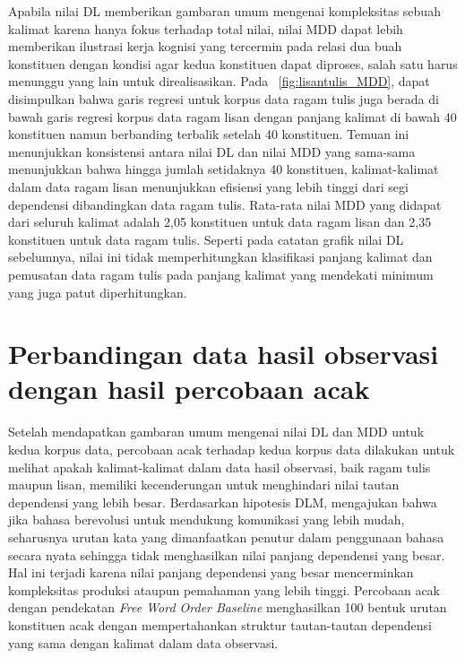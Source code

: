 Apabila nilai DL memberikan gambaran umum mengenai kompleksitas sebuah kalimat karena hanya fokus terhadap total nilai, nilai MDD dapat lebih memberikan ilustrasi kerja kognisi yang tercermin pada relasi dua buah konstituen dengan kondisi agar kedua konstituen dapat diproses, salah satu harus menunggu yang lain untuk direalisasikan. Pada \pic~\ref{fig:lisantulis_MDD}, dapat disimpulkan bahwa garis regresi untuk korpus data ragam tulis juga berada di bawah garis regresi korpus data ragam lisan dengan panjang kalimat di bawah 40 konstituen namun berbanding terbalik setelah 40 konstituen. Temuan ini menunjukkan konsistensi antara nilai DL dan nilai MDD yang sama-sama menunjukkan bahwa hingga jumlah setidaknya 40 konstituen, kalimat-kalimat dalam data ragam lisan menunjukkan efisiensi yang lebih tinggi dari segi dependensi dibandingkan data ragam tulis. Rata-rata nilai MDD yang didapat dari seluruh kalimat adalah 2,05 konstituen untuk data ragam lisan dan 2,35 konstituen untuk data ragam tulis. Seperti pada catatan grafik nilai DL sebelumnya, nilai ini tidak memperhitungkan klasifikasi panjang kalimat dan pemusatan data ragam tulis pada panjang kalimat yang mendekati minimum yang juga patut diperhitungkan.

\section{Perbandingan data hasil observasi dengan hasil percobaan acak}
Setelah mendapatkan gambaran umum mengenai nilai DL dan MDD untuk kedua korpus data, percobaan acak terhadap kedua korpus data dilakukan untuk melihat apakah kalimat-kalimat dalam data hasil observasi, baik ragam tulis maupun lisan, memiliki kecenderungan untuk menghindari nilai tautan dependensi yang lebih besar. Berdasarkan hipotesis DLM, \cite{futrell2015large} mengajukan bahwa jika bahasa berevolusi untuk mendukung komunikasi yang lebih mudah, seharusnya urutan kata yang dimanfaatkan penutur dalam penggunaan bahasa secara nyata sehingga tidak menghasilkan nilai panjang dependensi yang besar. Hal ini terjadi karena nilai panjang dependensi yang besar mencerminkan kompleksitas produksi ataupun pemahaman yang lebih tinggi. Percobaan acak dengan pendekatan \textit{Free Word Order Baseline} menghasilkan 100 bentuk urutan konstituen acak dengan mempertahankan struktur tautan-tautan dependensi yang sama dengan kalimat dalam data observasi. 

